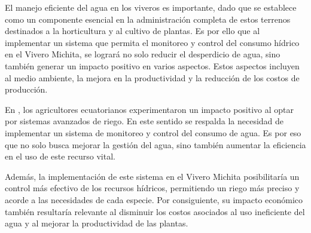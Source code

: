 El manejo eficiente del agua en los viveros es importante, dado que se establece como un componente esencial en la administración completa de estos terrenos destinados a la horticultura y al cultivo de plantas. Es por ello que al implementar un sistema que permita el monitoreo y control del consumo hídrico en el Vivero Michita, se logrará no solo reducir el desperdicio de agua, sino también generar un impacto positivo en varios aspectos. Estos aspectos incluyen al medio ambiente, la mejora en la productividad y la reducción de los costos de producción.

\bigbreak 
En \cite{riego_tecnificado}, los  agricultores ecuatorianos experimentaron un impacto positivo al optar por sistemas avanzados de riego. En este sentido se respalda la necesidad de implementar un sistema de monitoreo y control del consumo de agua. Es por eso que no solo busca mejorar la gestión del agua, sino también aumentar la eficiencia en el uso de este recurso vital.

\bigbreak 
Además, la implementación de este sistema en el Vivero Michita posibilitaría un control más efectivo de los recursos hídricos, permitiendo un riego más preciso y acorde a las necesidades de cada especie. Por consiguiente, su impacto económico también resultaría relevante al disminuir los costos asociados al uso ineficiente del agua y al mejorar la productividad de las plantas.


